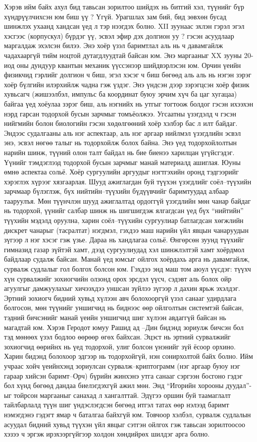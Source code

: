 Хэрэв ийм байх ахул бид тавьсан зорилтоо шийдэх нь битгий хэл, түүнийг бүр хүндрүүлчихсэн юм биш үү ? Үгүй. Урагшлах зам бий, бид зөвхөн бусад шинжлэх ухаанд хандсан үед л тэр нээгдэх болно. XII зуунаас эхлэн гэрэл эгэл хэсгээс (корпускул) бүрдэг үү, эсвэл эфир дэх долгион уу ? гэсэн асуудлаар маргалдаж эхэлсэн билээ. Энэ хоёр үзэл баримтлал аль нь ч давамгайлж чадахааргүй тийм ноцтой дутагдлуудтай байсан юм. Энэ маргааныг XX зууны 20-иод оны дундуур квантын механик үүссэнээр шийдвэрлэсэн юм. Орчин үеийн физикчид гэрлийг долгион ч биш, эгэл хэсэг ч биш бөгөөд аль аль нь нэгэн зэрэг хоёр бүлгийн илэрхийлж чадна гэж үздэг. Энэ үндсэн дээр зэрэгцсэн хоёр физик хувьсагч (жишээлбэл, импульс ба координат буюу эрчим хүч ба цаг хугацаа) байгаа үед хоёулаа зэрэг биш, аль нэгнийх нь утгыг тогтоож болдог гэсэн ихээхэн нэрд гарсан тодорхой бусын зарчмыг томъёолжээ.
Угсаатны үзэгдэлд ч гэсэн нийгмийн болон биологийн гэсэн хөдөлгөөний хоёр хэлбэр бас л илт байдаг. Эндээс судалгааны аль нэг аспектаар, аль нэг аргаар нийлмэл үзэгдлийн эсвэл энэ, эсвэл нөгөө талыг нь тодорхойлж болох байна. Энэ үед тодорхойлолтын нарийн шинж, түүний олон талт байдал нь бие биенээ харилцан үгүйсгэдэг. Үүнийг тэмдэглээд тодорхой бусын зарчмыг манай материалд ашиглая.
Юуны өмнө аспектаа сольё. Хоёр сургуулийн аргуудыг нэгтгэхийн оронд тэдгээрийг хэрэглэх хүрээг хязгаарлая. Шууд ажиглагдан буй түүхэн үзэгдлийг соёл–түүхийн зарчмаар бүлэглэж, бүх нийтийн–түүхийн бүдүүвчийг баримтуудад албаар тааруулъя. Мөн түүнчлэн шууд ажиглалтад ордоггүй үзэгдлийн мөн чанар байдаг нь тодорхой, үүнийг салбар шинж нь шигшигдэж ялгагдсан үед бүх “нийтийн” түүхийн мэдэлд оруулна, харин соёл–түүхийн сургуулиар батлагдсан хөгжлийн дискрет чанарыг (тасралтат) нэгдмэл, гэхдээ маш нарийн үйл явцын чанаруудын зүгээр л нэг хэсэг гэж үзье.
Дараа нь хандлагаа сольё. Өнгөрсөн зуунд түүхийг гимназид газар зүйтэй хамт, дээд сургуулиудад хэл шинжлэлтэй хамт хоёрдмол байдлаар судалж байсан. Манай үед юмсыг ойлгох хоёрдахь арга нь давамгайлж, сурвалж судлалыг гол болгох болсон юм. Гэхдээ энд маш том аюул үүсдэг: түүхч хүн сурвалжийг зохиогчийн олзонд орох эрсдэл үүсч, сэдэвт аль болох ойр агуулгыг дамжуулахыг хичээхдээ уншсан зүйлээ зүгээр л дахин ярьж эхэлдэг. Эртний зохиогч бидний хувьд хүлээн авч болохооргүй үзэл санааг удирдлага болгосон, мөн түүнийг уншигчид нь биднээс өөр ойлголтын системтэй байсан, тэдний бичсэнийг манай үеийн уншигчид шиг хүлээн авдаггүй байсан нь магадтай юм. Хэрэв Геродот юмуу Рашид ад –Дин бидэнд зориулж бичсэн бол тэд мөнөөх үзэл бодлоо өөрөөр өгөх байхсан. Эцэст нь эртний сурвалжийг зохиогчид өөрийнх нь үед тодорхой, улиг болсон үнэнийг зүй ёсоор орхино. Харин бидэнд болохоор эдгээр нь тодорхойгүй, нэн сонирхолтой байх болно. Ийм учраас хойч үеийнхэнд зориулсан сурвалж–криптограмм (нэг аргаар буюу нэг гараар хийсэн баримт–Орч) бүрийн жинхэнэ утга санааг сэргээн босгоно гэдэг бол хүнд бөгөөд дандаа биелэгдэхгүй ажил мөн. Энд “Игорийн хорооны дуудал”- ыг тойрсон маргааныг санахад л хангалттай. Эдүгээ оршин буй таамаглалт тайлбарлалд түүн шиг үндэслэгдсэн бөгөөд итгэл татах өөр нэлээд баримт нэмэгдэнэ гэдэгт ямар ч баталгаа байхгүй юм. Товчоор хэлбэл, сурвалж судлалын асуудал бидний хувьд түүхэн үйл явцыг сэтгэн ойлгох гэж тавьсан зорилтоосоо хэзээ ч эргэж ирэхээргүйгээр холдон хөндийрөх шилдэг арга болно.

